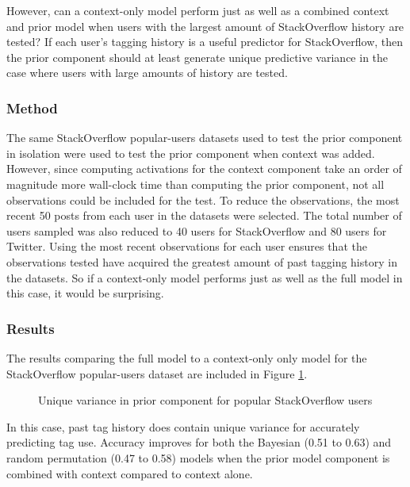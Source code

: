 \documentclass[man,floatsintext,donotrepeattitle]{apa6}
\begin{document}
However, can a context-only model perform just as well as a combined context and prior model when users with the largest amount of StackOverflow history are tested?
If each user's tagging history is a useful predictor for StackOverflow,
then the prior component should at least generate unique predictive variance in the case where users with large amounts of history are tested.

\subsubsection{Method}

The same StackOverflow popular-users datasets used to test the prior component in isolation were used to test the prior component when context was added.
However, since computing activations for the context component take an order of magnitude more wall-clock time than computing the prior component, not all observations could be included for the test.
To reduce the observations, the most recent 50 posts from each user in the datasets were selected.
The total number of users sampled was also reduced to 40 users for StackOverflow and 80 users for Twitter.
Using the most recent observations for each user ensures that the observations tested have acquired the greatest amount of past tagging history in the datasets.
So if a context-only model performs just as well as the full model in this case, it would be surprising.

\subsubsection{Results}

The results comparing the full model to a context-only only model for the StackOverflow popular-users dataset are included in Figure \ref{figPUAddPrior}.

\begin{figure}[!htbp]
  \caption{Unique variance in prior component for popular StackOverflow users}
  \label{figPUAddPrior}
\end{figure}

In this case, past tag history does contain unique variance for accurately predicting tag use.
Accuracy improves for both the Bayesian (\num{.51} to \num{.63}) and random permutation (\num{.47} to \num{.58}) models when the prior model component is combined with context compared to context alone.
\end{document}
